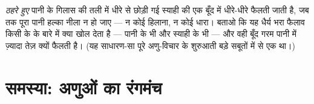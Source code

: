 \begin{exercise}[$\star\star\star$]\label{exo:g7:states-of-matter:12}
\emph{ठहरे हुए} पानी के गिलास की तली में धीरे से छोड़ी गई स्याही की एक
बूँद  में धीरे-धीरे फैलती जाती है, जब तक पूरा पानी हल्का नीला न
हो जाए --- न कोई हिलाना, न कोई धारा। बताओ कि यह धैर्य भरा फैलाव किसी
 के  के बारे में क्या खोल देता है --- पानी के भी और स्याही के
भी --- और वही बूँद गरम पानी में ज़्यादा तेज़ क्यों फैलती है। (यह
साधारण-सा  पूरे अणु-विचार के शुरुआती बड़े सबूतों में से एक
था।)
\end{exercise}

\section{समस्या: अणुओं का रंगमंच}

